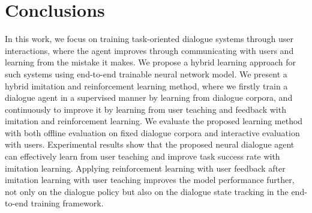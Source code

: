 \documentclass[11pt,a4paper]{article}
\begin{document}
\section{Conclusions}
    In this work, we focus on training task-oriented dialogue systems through user interactions, where the agent improves through communicating with users and learning from the mistake it makes. We propose a hybrid learning approach for such systems using end-to-end trainable neural network model. We present a hybrid imitation and reinforcement learning method, where we firstly train a dialogue agent in a supervised manner by learning from dialogue corpora, and continuously to improve it by learning from user teaching and feedback with imitation and reinforcement learning. We evaluate the proposed learning method with both offline evaluation on fixed dialogue corpora and interactive evaluation with users. Experimental results show that the proposed neural dialogue agent can effectively learn from user teaching and improve task success rate with imitation learning. Applying reinforcement learning with user feedback after imitation learning with user teaching improves the model performance further, not only on the dialogue policy but also on the dialogue state tracking in the end-to-end training framework.




\appendix
\end{document}
